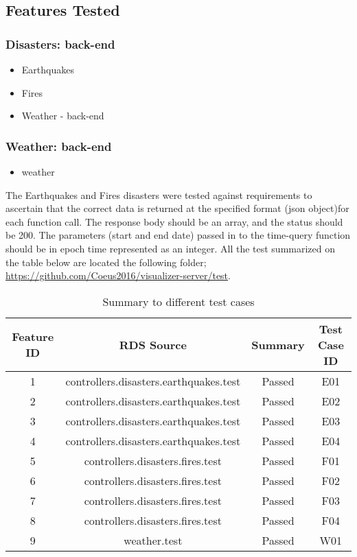 \subsection{Features Tested}
\subsubsection{Disasters: back-end}
\begin{itemize}

	\item Earthquakes
	\item Fires
	\item Weather - back-end
	
\end{itemize}

\subsubsection{Weather: back-end}
\begin{itemize}

	\item weather
	
\end{itemize}

The Earthquakes and Fires disasters were tested against requirements to ascertain that the correct data is returned at the specified format (json object)for each function call. The response body should be an array, and the status should be 200. The parameters (start and end date) passed in to the time-query function should be in epoch time represented as an integer. All the test summarized on the table below are located the following folder; \url{https://github.com/Coeus2016/visualizer-server/test}.

\begin{table}[h!]
\caption{Summary to different test cases}
\centering
\begin{tabular}{| c c c c |}
\hline
Feature ID & RDS Source & Summary & Test Case ID \\ [0.5ex]
\hline\hline
1 & controllers.disasters.earthquakes.test & Passed & E01 \\
2 & controllers.disasters.earthquakes.test & Passed & E02 \\
3 & controllers.disasters.earthquakes.test & Passed & E03 \\
4 & controllers.disasters.earthquakes.test & Passed & E04 \\
5 & controllers.disasters.fires.test & Passed & F01 \\
6 & controllers.disasters.fires.test & Passed & F02 \\
7 & controllers.disasters.fires.test & Passed & F03 \\
8 & controllers.disasters.fires.test & Passed & F04 \\
9 & weather.test & Passed & W01 \\ [1ex]
\hline
\end{tabular}
\end{table}



